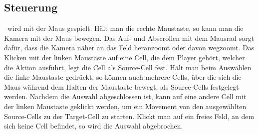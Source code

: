 \subsection{Steuerung}
\vires\ wird mit der Maus gespielt. Hält man die rechte Maustaste, so kann man die Kamera mit der Maus bewegen. Das Auf- und Abscrollen mit dem Mausrad sorgt dafür, dass die Kamera näher an das Feld heranzoomt oder davon wegzoomt. Das Klicken mit der linken Maustaste auf eine Cell, die dem Player gehört, welcher die Aktion ausführt, legt die Cell als Source-Cell fest. Hält man beim Auswählen die linke Maustaste gedrückt, so können auch mehrere Cells, über die sich die Maus während dem Halten der Maustaste bewegt, als Source-Cells festgelegt werden. Nachdem die Auswahl abgeschlossen ist, kann auf eine andere Cell mit der linken Maustaste geklickt werden, um ein Movement von den ausgewählten Source-Cells zu der Target-Cell zu starten. Klickt man auf ein freies Feld, an dem sich keine Cell befindet, so wird die Auswahl abgebrochen.